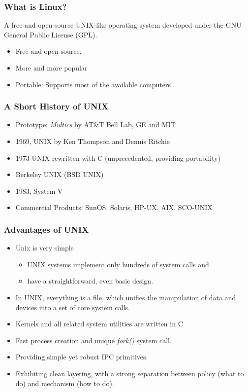 \documentclass[red]{beamer}
\begin{document}
\begin{CJK*}{GBK}{kai}
\begin{frame}
\frametitle{What is Linux?}
A free and open-source UNIX-like operating system developed under 
the GNU General Public License (GPL).
\begin{itemize}
    \item Free and open source.
    \item More and more popular
    \item Portable: Supports most of the available computers
\end{itemize}
\end{frame}

\begin{frame}
\frametitle{A Short History of UNIX}
\begin{itemize}
    \item Prototype: \emph{Multics} by AT\&T Bell Lab, GE and MIT
    \item 1969, UNIX by Ken Thompson and Dennis Ritchie
    \item 1973 UNIX rewritten with C (unprecedented, providing portability)
    \item Berkeley UNIX (BSD UNIX)
    \item 1983, System V
    \item Commercial Products: SunOS, Solaris, HP-UX, AIX, SCO-UNIX
\end{itemize}
\end{frame}

\begin{frame}
\frametitle{Advantages of UNIX}
\begin{itemize}
    \item Unix is very simple
    \begin{itemize}
        \item UNIX systems implement only hundreds of system calls and
        \item have a straightforward, even basic design.
    \end{itemize}
    \item In UNIX, everything is a file, which unifies the manipulation
        of data and devices into a set of core system calls.
    \item Kernels and all related system utilities are written in C
    \item Fast process creation and unique \emph{fork()} system call.
    \item Providing simple yet robust IPC  primitives.
    \item Exhibiting clean layering, with a strong separation between policy (what to do) 
		and mechanism (how to do).
\end{itemize}
\end{frame}


\end{CJK*}
\end{document}
